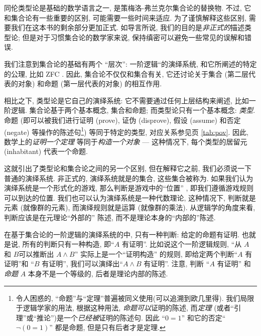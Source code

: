 \label{sec:axioms}

同伦类型论是基础的数学语言之一, 是策梅洛-弗兰克尔集合论的替换物. 不过, 它和集合论有一些重要的区别, 可能需要一些时间来适应. 为了谨慎解释这些区别, 需要我们在这本书的剩余部分更加正式. 如导言所说, 我们的目的是\emph{非正式的}描述类型论; 但是对于习惯集合论的数学家来说, 保持缜密可以避免一些常见的误解和错误. 

我们注意到集合论的基础有两个 ``层次'': 一阶逻辑``的演绎系统, 和它所阐述的特定的公理, 比如 ZFC . 因此, 集合论不仅仅和集合有关, 它还讨论关于集合 (第二层代表的对象) 和命题 (第一层代表的对象) 的相互作用. 

相比之下, 类型论是它自己的演绎系统: 它不需要通过任何上层结构来阐述, 比如一阶逻辑. 集合论基于两个基本概念, 集合和命题; 而类型论只有一个基本概念: \emph{类型}. 命题 (即可以被我们进行证明 (prove), 证伪 (disprove), 假设 (assume) 和否定 (negate) 等操作的陈述句\footnote{令人困惑的, ``命题''与``定理''普遍被同义使用(可以追溯到欧几里得). 我们局限于逻辑学家的用法, 根据这种用法, \emph{命题}\emph{可以}证明的陈述, 而\emph{定理} (或者``引理''或``推论'')是一个\emph{已经被}证明的陈述句.
因此 ``$0=1$'' 和它的否定``$\neg(0=1)$'' 都是命题, 但是只有后者才是定理.}) 等同于特定的类型, 对应关系参见\pageref{tab:pov}页 \cref{tab:pov}. 因此,  数学上的\emph{证明一个定理} 等同于\emph{构造一个对象} --- 这种情况下, 每个类型的居留元 (inhabitant) 代表一个命题. 

%
这就引出了类型论和集合论之间的另一个区别, 但在解释它之前, 我们必须说一下普通的演绎系统. 非正式的, 演绎系统就是的集合,%
这些集合被称为. %
如果我们认为演绎系统是一个形式化的游戏, %
那么判断是游戏中的``位置'' , 即我们遵循游戏规则可以到达的位置. 我们也可以认为演绎系统是一种代数理论, 这种情况下, 判断就是元素 (就像群的元素), 而演绎规则就是运算 (就像群的乘法). 从逻辑学的角度来看, 判断应该是在元理论``外部的'' 陈述,  而不是理论本身的``内部的''陈述. 

在基于集合论的一阶逻辑的演绎系统的中, 只有一种判断: 给定的命题有证明. 也就是说, 所有的判断只有一种构造, 即``$A$ 有证明''. 比如说这个一阶逻辑规则, ``从 $A$ 和 $B$可以推断出 $A\wedge B$'' 实际上是一个``证明构造'' 的规则, 即给定两个判断``$A$ 有证明''和 ``$B$ 有证明'', 我们可以演绎出``$A\wedge B$ 有证明''. 注意, 判断 ``$A$ 有证明'' 和 \emph{命题} $A$ 本身不是一个等级的, 后者是理论内部的陈述. %


